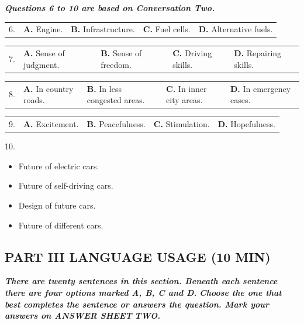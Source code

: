 \documentclass[UTF8,11pt]{ctexart}
\begin{document}
\textbf{\textit{Questions 6 to 10 are based on Conversation Two.}}


\noindent\begin{tabularx}{\linewidth}{@{}lXXXX@{}}6. & \textbf{A.} Engine. & \textbf{B.} Infrastructure. & \textbf{C.} Fuel cells. & \textbf{D.} Alternative fuels.\\\end{tabularx}\par

\noindent\begin{tabularx}{\linewidth}{@{}lXXXX@{}}7. & \textbf{A.} Sense of judgment. & \textbf{B.} Sense of freedom. & \textbf{C.} Driving skills. & \textbf{D.} Repairing skills.\\\end{tabularx}\par

\noindent\begin{tabularx}{\linewidth}{@{}lXXXX@{}}8. & \textbf{A.} In country roads. & \textbf{B.} In less congested areas. & \textbf{C.} In inner city areas. & \textbf{D.} In emergency cases.\\\end{tabularx}\par

\noindent\begin{tabularx}{\linewidth}{@{}lXXXX@{}}9. & \textbf{A.} Excitement. & \textbf{B.} Peacefulness. & \textbf{C.} Stimulation. & \textbf{D.} Hopefulness.\\\end{tabularx}\par

10.


\begin{itemize}[leftmargin=2em,itemsep=.2em,topsep=.4em]\item[A.] Future of electric cars.
\item[B.] Future of self-driving cars.
\item[C.] Design of future cars.
\item[D.] Future of different cars.
\end{itemize}

\subsection*{\textbf{PART III LANGUAGE USAGE (10 MIN)}}


\textbf{\textit{There are twenty sentences in this section. Beneath each sentence there are four options marked A, B, C and D.}} \textbf{\textit{Choose the one that best completes the sentence or answers the question. Mark your answers on ANSWER SHEET}} \textbf{\textit{TWO.}}
\end{document}

